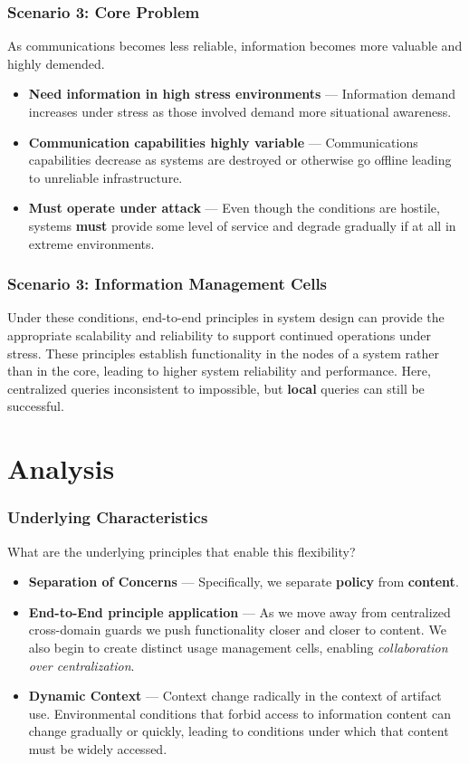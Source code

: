 \documentclass[t,handout, 10pt]{beamer}
\begin{document}
\begin{frame}
\frametitle{Scenario 3: Core Problem}
As communications becomes less reliable, information becomes more valuable and highly demended.
\newline
\newline
\pause
\begin{itemize}
\item \textbf{Need information in high stress environments} --- Information demand increases under stress as those involved demand more situational awareness.
\pause
\item \textbf{Communication capabilities highly variable} --- Communications capabilities decrease as systems are destroyed or otherwise go offline leading to unreliable infrastructure.
\pause
\item \textbf{Must operate under attack} --- Even though the conditions are hostile, systems \textbf{must} provide some level of service and degrade gradually if at all in extreme environments.
\end{itemize}
\end{frame}

\begin{frame}
\frametitle{Scenario 3: Information Management Cells}
Under these conditions, end-to-end principles in system design can provide the appropriate scalability and reliability to support continued operations under stress.  
\newline
\newline
\pause
These principles establish functionality in the nodes of a system rather than in the core, leading to higher system reliability and performance.  
\newline
\newline
\pause
Here, centralized queries inconsistent to impossible, but \textbf{local} queries can still be successful.
\end{frame}

\section{Analysis}

\begin{frame}
\frametitle{Underlying Characteristics}
What are the underlying principles that enable this flexibility?
\pause
\begin{itemize}
\item \textbf{Separation of Concerns} --- Specifically, we separate \textbf{policy} from \textbf{content}.
\pause
\item \textbf{End-to-End principle application} --- As we move away from centralized cross-domain guards we push functionality closer and closer to content.  We also begin to create distinct usage management cells, enabling \textit{collaboration over centralization}.
\pause
\item \textbf{Dynamic Context} --- Context change radically in the context of artifact use.  Environmental conditions that forbid access to information content can change gradually or quickly, leading to conditions under which that content must be widely accessed.
\pause
\end{itemize}
\end{frame}
\end{document}
